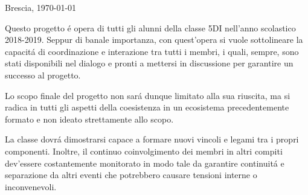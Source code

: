 \documentclass[../documentazione.tex]{subfiles}
\begin{document}
    \begin{flushright}
        Brescia, \today
    \end{flushright}

    Questo progetto é opera di tutti gli alunni della classe 5DI nell'anno scolastico 2018-2019.
    Seppur di banale importanza, con quest'opera si vuole sottolineare la capacitá di coordinazione e interazione tra tutti i membri,
    i quali, sempre, sono stati disponibili nel dialogo e pronti a mettersi in discussione per garantire un successo al progetto.

    Lo scopo finale del progetto non sará dunque limitato alla sua riuscita, ma si radica in tutti gli aspetti della coesistenza in un ecosistema precedentemente formato
    e non ideato strettamente allo scopo.

    La classe dovrá dimostrarsi capace a formare nuovi vincoli e legami tra i propri componenti.
    Inoltre, il continuo coinvolgimento dei membri in altri compiti dev'essere costantemente monitorato in modo tale da garantire continuitá e separazione da altri eventi che potrebbero causare
    tensioni interne o inconvenevoli.
\end{document}
